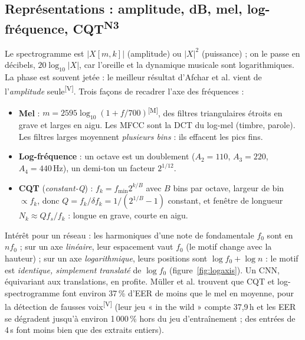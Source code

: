 \documentclass[10pt,a4paper]{article}
\newcommand{\sV}{\textsuperscript{\scriptsize\textcolor{green!40!black}{[V]}}}
\newcommand{\sM}{\textsuperscript{\scriptsize\textcolor{red!70!black}{[M]}}}
\newcommand{\nref}[1]{\textsuperscript{\scriptsize\textcolor{black!55}{#1}}}
\begin{document}
\subsection{Représentations : amplitude, dB, mel, log-fréquence, CQT\nref{N3}}
\label{sec:repr}
Le spectrogramme est $|X[m,k]|$ (amplitude) ou $|X|^2$ (puissance) ; on le passe en décibels, $20\log_{10}|X|$, car l'oreille et la dynamique musicale sont logarithmiques. La phase est souvent jetée : le meilleur résultat d'Afchar et al. vient de l'\emph{amplitude} seule\sV. Trois façons de recadrer l'axe des fréquences :
\begin{itemize}
  \item \textbf{Mel} : $m=2595\log_{10}(1+f/700)$\sM, des filtres triangulaires étroits en grave et larges en aigu. Les MFCC sont la DCT du log-mel (timbre, parole). Les filtres larges moyennent \emph{plusieurs bins} : ils effacent les pics fins.
  \item \textbf{Log-fréquence} : un octave est un doublement ($A_2{=}110$, $A_3{=}220$, $A_4{=}440$\,Hz), un demi-ton un facteur $2^{1/12}$.
  \item \textbf{CQT} (\emph{constant-Q}) : $f_k=f_{\min}2^{k/B}$ avec $B$ bins par octave, largeur de bin $\propto f_k$, donc $Q=f_k/\delta f_k=1/(2^{1/B}-1)$ constant, et fenêtre de longueur $N_k\ensuremath{\approx}Qf_s/f_k$ : longue en grave, courte en aigu.
\end{itemize}
Intérêt pour un réseau : les harmoniques d'une note de fondamentale $f_0$ sont en $nf_0$ ; sur un axe \emph{linéaire}, leur espacement vaut $f_0$ (le motif change avec la hauteur) ; sur un axe \emph{logarithmique}, leurs positions sont $\log f_0+\log n$ : le motif est \emph{identique, simplement translaté} de $\log f_0$ (figure~\ref{fig:logaxis}). Un CNN, équivariant aux translations, en profite. Müller et al. trouvent que CQT et log-spectrogramme font environ 37\,\% d'EER de moins que le mel en moyenne, pour la détection de fausses voix\sV{} (leur jeu « in the wild » compte 37,9\,h et les EER se dégradent jusqu'à environ 1\,000\,\% hors du jeu d'entraînement ; des entrées de 4\,s font moins bien que des extraits entiers).
\end{document}
